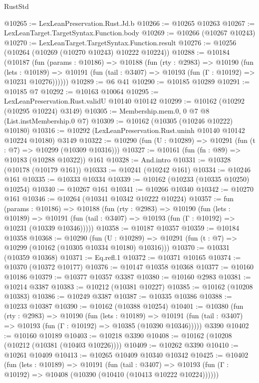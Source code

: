 \begin{lexlean}{RustStd}
\begin{coremodule}
@10265 := LexLeanPreservation.Rust.Jd.b
@10266 := @10265 @10263
@10267 := LexLeanTarget.TargetSyntax.Function.body
@10269 := @10266 (@10267 @10243)
@10270 := LexLeanTarget.TargetSyntax.Function.result
@10276 := @10256 (@10264 (@10269 (@10270 @10243) @10222 @10224))
@10288 := @10184
    (@10187
      (fun (params : @10186) =>
      @10188
        (fun (rty : @2983) =>
        @10190
          (fun (lets : @10189) =>
          @10191 (fun (tail : @3407) => @10193 (fun (Γ : @10192) => @10231 @10276))))))
@10289 := @6 @41
@10290 := @10185 @10289
@10291 := @10185 @7
@10292 := @10163 @10064
@10295 := LexLeanPreservation.Rust.validU @10140 @10142
@10299 := @10162 (@10292 (@10295 @10224) @3149)
@10305 := Membership.mem.{0, 0} @7 @8 (List.instMembership.{0} @7)
@10309 := @10162 (@10305 (@10246 @10222) @10180)
@10316 := @10292 (LexLeanPreservation.Rust.uninh @10140 @10142 @10224 @10180) @3149
@10322 := @10290 (fun (U : @10289) => @10291 (fun (t : @7) => @10299 (@10309 @10316)))
@10327 := @10161 (fun (fn : @89) => @10183 (@10288 @10322)) @161
@10328 := And.intro
@10331 := @10328 (@10178 (@10179 @161))
@10333 := @10241 (@10242 @161)
@10334 := @10246 @161
@10335 := @10333 @10334
@10339 := @10162 (@10233 (@10335 @10250) @10254)
@10340 := @10267 @161
@10341 := @10266 @10340
@10342 := @10270 @161
@10346 := @10264 (@10341 @10342 @10222 @10224)
@10357 := fun (params : @10186) =>
  @10188
    (fun (rty : @2983) =>
    @10190
      (fun (lets : @10189) =>
      @10191 (fun (tail : @3407) => @10193 (fun (Γ : @10192) => @10231 (@10339 @10346)))))
@10358 := @10187 @10357
@10359 := @10184 @10358
@10368 := @10290
    (fun (U : @10289) => @10291 (fun (t : @7) => @10299 (@10162 (@10305 @10334 @10180) @10316)))
@10370 := @10331 (@10359 @10368)
@10371 := Eq.refl.{1}
@10372 := @10371 @10165
@10374 := @10370 (@10372 @10177)
@10376 := @10147 @10358 @10368
@10377 := @10160 @10186
@10379 := @10377 @10357 @3387
@10380 := @10160 @2983
@10381 := @10214 @3387
@10383 := @10212 (@10381 @10227)
@10385 := @10162 (@10208 @10383)
@10386 := @10249 @3387
@10387 := @10335 @10386
@10388 := @10233 @10387
@10390 := @10162 (@10388 @10254)
@10401 := @10380
    (fun (rty : @2983) =>
    @10190
      (fun (lets : @10189) =>
      @10191 (fun (tail : @3407) => @10193 (fun (Γ : @10192) => @10385 (@10390 @10346)))))
    @3390
@10402 := @10160 @10189
@10403 := @10218 @3390
@10408 := @10162 (@10208 (@10212 (@10381 (@10403 @10226))))
@10409 := @10262 @3390
@10410 := @10261 @10409
@10413 := @10265 @10409 @10340 @10342
@10425 := @10402
    (fun (lets : @10189) =>
    @10191
      (fun (tail : @3407) =>
      @10193 (fun (Γ : @10192) => @10408 (@10390 (@10410 (@10413 @10222 @10224))))))

\end{coremodule}
\end{lexlean}
